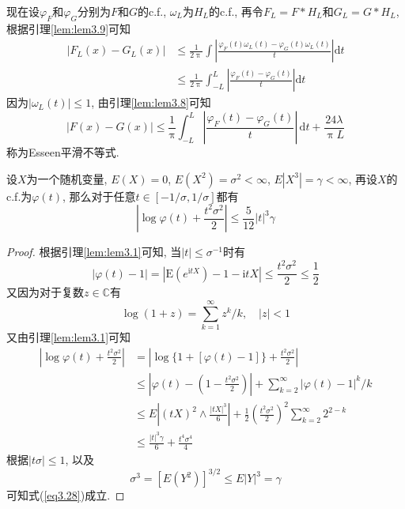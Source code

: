 \documentclass[cn, 12pt, math=mtpro2, bibstyle=apa, blue, twocol]{elegantbook}
\begin{document}
现在设$\varphi_F$和$\varphi_G$分别为$F$和$G$的c.f., $\omega_L$为$H_L$的c.f., 再令$F_L=F\ast H_L$和$G_L=G\ast H_L$, 根据引理\ref{lem:lem3.9}可知
\begin{align*}
|F_L(x)-G_L(x)|&\leq\frac{1}{2\uppi}\int\left|\frac{\varphi_F(t)\omega_L(t)-\varphi_G(t)\omega_L(t)}{t}\right|\text{d}t \\
&\leq\frac{1}{2\uppi}\int_{-L}^{L}\left|\frac{\varphi_F(t)-\varphi_G(t)}{t}\right|\text{d}t
\end{align*}
因为$|\omega_L(t)|\leq 1$, 由引理\ref{lem:lem3.8}可知
\begin{equation}\label{eq3.26}
  |F(x)-G(x)|\leq\frac{1}{\uppi}\int_{-L}^{L}\left|\frac{\varphi_F(t)-\varphi_G(t)}{t}\right|\,\text{d}t+\frac{24\lambda}{\uppi L}
\end{equation}
称为Esseen平滑不等式.

\begin{lemma}\label{lem:lem3.10}
设$X$为一个随机变量, $E(X)=0$, $E(X^2)=\sigma^2<\infty$, $E|X^3|=\gamma<\infty$, 再设$X$的c.f.为$\varphi(t)$, 那么对于任意$t\in [-1/\sigma,1/\sigma]$都有
\begin{equation}\label{eq3.28}
  \left|\log\varphi(t)+\frac{t^2\sigma^2}{2}\right|\leq \frac{5}{12}|t|^3\gamma
\end{equation}
\end{lemma}
\begin{proof}
  根据引理\ref{lem:lem3.1}可知, 当$|t|\leq\sigma^{-1}$时有
  \begin{equation}\label{eq3.30}
    |\varphi(t)-1|=|\text{E}(e^{\text{i}tX})-1-\text{i}tX|\leq \frac{t^2\sigma^2}{2}\leq\frac{1}{2}
  \end{equation}
  又因为对于复数$z\in\mathbb{C}$有
  $$\log(1+z)=\sum_{k=1}^{\infty}z^k/k,\quad |z|<1$$
  又由引理\ref{lem:lem3.1}可知
  \begin{align*}
  \left|\log\varphi(t)+\frac{t^2\sigma^2}{2}\right|&=\left|\log\{1+[\varphi(t)-1]\}+\frac{t^2\sigma^2}{2}\right| \\
  &\leq \left|\varphi(t)-\left(1-\frac{t^2\sigma^2}{2}\right)\right|+\sum_{k=2}^{\infty}|\varphi(t)-1|^k/k \\
  &\leq E\left|(tX)^2\wedge \frac{|tX|^3}{6}\right|+\frac{1}{2}\left(\frac{t^2\sigma^2}{2}\right)^2\sum_{k=2}^{\infty}2^{2-k} \\
  &\leq \frac{|t|^3\gamma}{6}+\frac{t^4\sigma^4}{4}
  \end{align*}
  根据$|t\sigma|\leq 1$, 以及
  $$\sigma^3=[E(Y^2)]^{3/2}\leq E|Y|^3=\gamma$$可知式(\ref{eq3.28})成立.
\end{proof}
\end{document}
